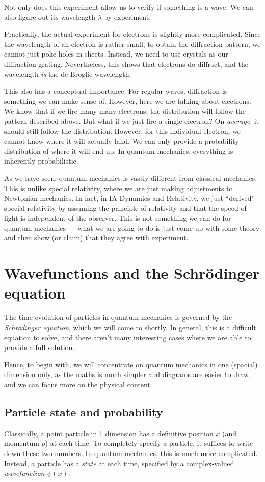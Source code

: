 \documentclass[a4paper]{article}
\begin{document}
Not only does this experiment allow us to verify if something is a wave. We can also figure out its wavelength $\lambda$ by experiment.

Practically, the actual experiment for electrons is slightly more complicated. Since the wavelength of an electron is rather small, to obtain the diffraction pattern, we cannot just poke holes in sheets. Instead, we need to use crystals as our diffraction grating. Nevertheless, this shows that electrons do diffract, and the wavelength \emph{is} the de Broglie wavelength.

This also has a conceptual importance. For regular waves, diffraction is something we can make sense of. However, here we are talking about electrons. We know that if we fire many many electrons, the distribution will follow the pattern described above. But what if we just fire a single electron? On \emph{average}, it should still follow the distribution. However, for this individual electron, we cannot know where it will actually land. We can only provide a probability distribution of where it will end up. In quantum mechanics, everything is inherently probabilistic.

As we have seen, quantum mechanics is vastly different from classical mechanics. This is unlike special relativity, where we are just making adjustments to Newtonian mechanics. In fact, in IA Dynamics and Relativity, we just ``derived'' special relativity by assuming the principle of relativity and that the speed of light is independent of the observer. This is not something we can do for quantum mechanics --- what we are going to do is just come up with some theory and then show (or claim) that they agree with experiment.

\section{Wavefunctions and the Schr\"odinger equation}
The time evolution of particles in quantum mechanics is governed by the \emph{Schr\"odinger equation}, which we will come to shortly. In general, this is a difficult equation to solve, and there aren't many interesting cases where we are able to provide a full solution.

Hence, to begin with, we will concentrate on quantum mechanics in one (spacial) dimension only, as the maths is much simpler and diagrams are easier to draw, and we can focus more on the physical content.

\subsection{Particle state and probability}
Classically, a point particle in 1 dimension has a definitive position $x$ (and momentum $p$) at each time. To completely specify a particle, it suffices to write down these two numbers. In quantum mechanics, this is much more complicated. Instead, a particle has a \emph{state} at each time, specified by a complex-valued \emph{wavefunction} $\psi(x)$.
\end{document}
